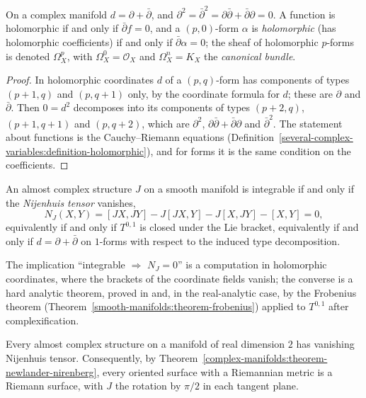\begin{proposition}\label{complex-manifolds:proposition-dbar}
On a complex manifold $d = \partial + \bar\partial$, and $\partial^2 = \bar\partial^2 = \partial\bar\partial + \bar\partial\partial = 0$. A function is holomorphic if and only if $\bar\partial f = 0$, and a $(p, 0)$-form
$\alpha$ is \emph{holomorphic} (has holomorphic coefficients) if and only if $\bar\partial\alpha = 0$; the sheaf of holomorphic $p$-forms is denoted $\Omega^p_X$, with $\Omega^0_X = \mathcal{O}_X$ and
$\Omega^n_X = K_X$ the \emph{canonical bundle}.
\end{proposition}

\begin{proof}
In holomorphic coordinates $d$ of a $(p,q)$-form has components of types $(p+1, q)$ and $(p, q+1)$ only, by the coordinate formula for $d$; these are $\partial$ and $\bar\partial$. Then $0 = d^2$ decomposes into
its components of types $(p+2, q)$, $(p+1, q+1)$ and $(p, q+2)$, which are $\partial^2$, $\partial\bar\partial + \bar\partial\partial$ and $\bar\partial^2$. The statement about functions is the Cauchy--Riemann
equations (Definition~\ref{several-complex-variables:definition-holomorphic}), and for forms it is the same condition on the coefficients.
\end{proof}

\begin{theorem}\label{complex-manifolds:theorem-newlander-nirenberg}
An almost complex structure $J$ on a smooth manifold is integrable if and only if the \emph{Nijenhuis tensor} vanishes,
\[
N_J(X, Y) = [JX, JY] - J[JX, Y] - J[X, JY] - [X, Y] = 0,
\]
equivalently if and only if $T^{0,1}$ is closed under the Lie bracket, equivalently if and only if $d = \partial + \bar\partial$ on $1$-forms with respect to the induced type decomposition.
\end{theorem}

The implication ``integrable $\Rightarrow$ $N_J = 0$'' is a computation in holomorphic coordinates, where the brackets of the coordinate fields vanish; the converse is a hard analytic theorem, proved in
\cite[Chapter 2]{huybrechts-complex} and, in the real-analytic case, by the Frobenius theorem (Theorem~\ref{smooth-manifolds:theorem-frobenius}) applied to $T^{0,1}$ after complexification.

\begin{proposition}\label{complex-manifolds:proposition-surfaces-almost-complex}
Every almost complex structure on a manifold of real dimension $2$ has vanishing Nijenhuis tensor. Consequently, by Theorem~\ref{complex-manifolds:theorem-newlander-nirenberg}, every oriented surface with a Riemannian metric is a Riemann
surface, with $J$ the rotation by $\pi/2$ in each tangent plane.
\end{proposition}

